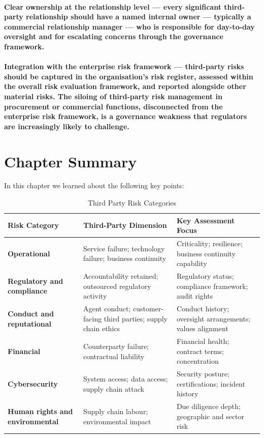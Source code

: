\paragraph{\textbf{Clear ownership at the relationship level} — every significant third-party relationship should have a named internal owner — typically a commercial relationship manager — who is responsible for day-to-day oversight and for escalating concerns through the governance framework.}
\paragraph{\textbf{Integration with the enterprise risk framework} — third-party risks should be captured in the organisation's risk register, assessed within the overall risk evaluation framework, and reported alongside other material risks. The siloing of third-party risk management in procurement or commercial functions, disconnected from the enterprise risk framework, is a governance weakness that regulators are increasingly likely to challenge.}

\newpage
\section{Chapter Summary}
In this chapter we learned about the following key points:

\begin{table}[H]
  \centering
  \renewcommand{\arraystretch}{1.5}
  \begin{tabularx}{\textwidth}{ | >{\raggedright\arraybackslash}p{} 
								| >{\raggedright\arraybackslash}p{} 
                                | >{\raggedright\arraybackslash}X | }
    \hline
    \textbf{Risk Category} & \textbf{Third-Party Dimension} & \textbf{Key Assessment Focus} \\
    \hline
    \textbf{Operational} & Service failure; technology failure; business continuity & Criticality; resilience; business continuity capability\\
    \hline
    \textbf{Regulatory and compliance} & Accountability retained; outsourced regulatory activity & Regulatory status; compliance framework; audit rights\\
    \hline
    \textbf{Conduct and reputational} & Agent conduct; customer-facing third parties; supply chain ethics & Conduct history; oversight arrangements; values alignment\\
    \hline
    \textbf{Financial} & Counterparty failure; contractual liability & Financial health; contract terms; concentration\\
    \hline
    \textbf{Cybersecurity} & System access; data access; supply chain attack & Security posture; certifications; incident history\\
    \hline
    \textbf{Human rights and environmental} & Supply chain labour; environmental impact & Due diligence depth; geographic and sector risk\\
    \hline
  \end{tabularx}
  \caption{Third Party Risk Categories}
\end{table}


